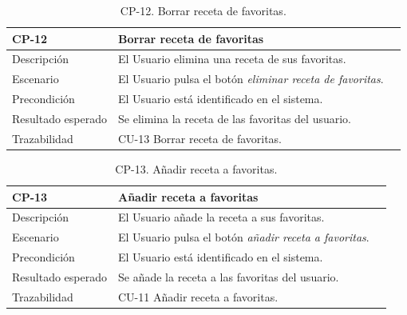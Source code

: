         \begin{table}[H]
            \centering
            \begin{tabularx}{1\textwidth} { 
                | >{\raggedright\arraybackslash}X 
                | >{\raggedright\arraybackslash}X 
                | >{\raggedright\arraybackslash}X
                |  }
            \hline
            \textbf{CP-12}     & \textbf{Borrar receta de favoritas}                             \\ \hline
            Descripción        & El Usuario elimina una receta de sus favoritas.      \\ \hline
            Escenario          & El Usuario pulsa el botón \textit{eliminar receta de favoritas}.                           \\ \hline
            Precondición          & El Usuario está identificado en el sistema.                             \\ \hline
            
            Resultado esperado & Se elimina la receta de las favoritas del usuario. \\ \hline
            Trazabilidad & CU-13 Borrar receta de favoritas.\\ \hline
        \end{tabularx}
        \caption{CP-12. Borrar receta de favoritas.}
        \label{table:CP-12}
            \end{table}


            \begin{table}[H]
                \centering
                \begin{tabularx}{1\textwidth} { 
                    | >{\raggedright\arraybackslash}X 
                    | >{\raggedright\arraybackslash}X 
                    | >{\raggedright\arraybackslash}X 
                    |  }
                \hline
                \textbf{CP-13}     & \textbf{Añadir receta a favoritas}                             \\ \hline
                Descripción        & El Usuario añade la receta a sus favoritas.      \\ \hline
                Escenario          & El Usuario pulsa el botón \textit{añadir receta a favoritas}.                            \\ \hline
                Precondición          & El Usuario está identificado en el sistema.                             \\ \hline
                
                Resultado esperado & Se añade la receta a las favoritas del usuario. \\ \hline
                Trazabilidad & CU-11 Añadir receta a favoritas.\\ \hline
            \end{tabularx}
            \caption{CP-13. Añadir receta a favoritas.}
            \label{table:CP-13}
                \end{table}



